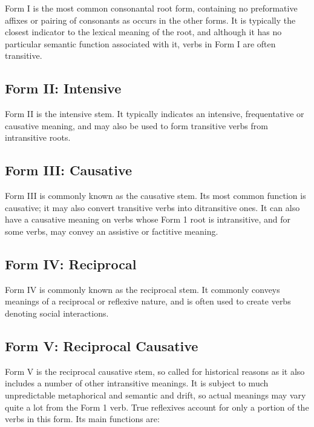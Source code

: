 \documentclass[grammar]{subfiles}
\begin{document}
Form I is the most common consonantal root form, containing no preformative
affixes or pairing of consonants as occurs in the other forms.  It is typically
the closest indicator to the lexical meaning of the root, and although it has
no particular semantic function associated with it, verbs in Form I are often
transitive.


\subsection{Form II: Intensive}
\label{ssec:vm_form_ii}

Form II is the intensive stem.  It typically indicates an intensive,
frequentative or causative meaning, and may also be used to form transitive
verbs from intransitive roots.


\subsection{Form III: Causative}
\label{ssec:vm_form_iii}

Form III is commonly known as the causative stem.  Its most common function is
causative; it may also convert transitive verbs into ditransitive ones.  It can
also have a causative meaning on verbs whose Form 1 root is intransitive, and
for some verbs, may convey an assistive or factitive meaning.

%   
\subsection{Form IV: Reciprocal}
\label{ssec:vm_form_iv}

Form IV is commonly known as the reciprocal stem.  It commonly conveys meanings
of a reciprocal or reflexive nature, and is often used to create verbs denoting
social interactions. 

%   
\subsection{Form V: Reciprocal Causative}
\label{ssec:vm_form_v}

Form V is the reciprocal causative stem, so called for historical reasons as it
also includes a number of other intransitive meanings.  It is subject to much
unpredictable metaphorical and semantic and drift, so actual meanings may vary
quite a lot from the Form 1 verb.  True reflexives account for only a portion
of the verbs in this form.  Its main functions are:
\end{document}
